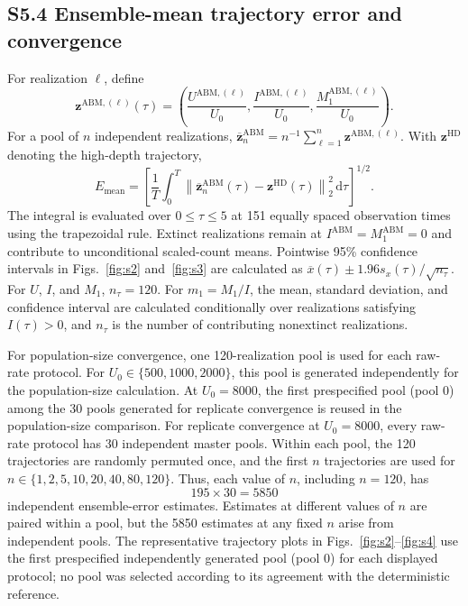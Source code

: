 \documentclass[11pt]{article}
\begin{document}
\subsection*{S5.4 Ensemble-mean trajectory error and convergence}
For realization $\ell$, define
\[
\mathbf z^{\mathrm{ABM},(\ell)}(\tau)=\left(\frac{U^{\mathrm{ABM},(\ell)}}{U_0},\frac{I^{\mathrm{ABM},(\ell)}}{U_0},\frac{M_1^{\mathrm{ABM},(\ell)}}{U_0}\right).
\]
For a pool of $n$ independent realizations, $\overline{\mathbf z}_n^{\mathrm{ABM}}=n^{-1}\sum_{\ell=1}^n\mathbf z^{\mathrm{ABM},(\ell)}$. With $\mathbf z^{\mathrm{HD}}$ denoting the high-depth trajectory,
\[
E_{\mathrm{mean}}=\left[\frac1T\int_0^T\left\|\overline{\mathbf z}_n^{\mathrm{ABM}}(\tau)-\mathbf z^{\mathrm{HD}}(\tau)\right\|_2^2\,\mathrm d\tau\right]^{1/2}.
\]
The integral is evaluated over $0\leq\tau\leq5$ at 151 equally spaced observation times using the trapezoidal rule. Extinct realizations remain at $I^{\mathrm{ABM}}=M_1^{\mathrm{ABM}}=0$ and contribute to unconditional scaled-count means. Pointwise 95\% confidence intervals in Figs.~\ref{fig:s2} and~\ref{fig:s3} are calculated as $\overline{x}(\tau)\pm1.96s_x(\tau)/\sqrt{n_\tau}$. For $U$, $I$, and $M_1$, $n_\tau=120$. For $m_1=M_1/I$, the mean, standard deviation, and confidence interval are calculated conditionally over realizations satisfying $I(\tau)>0$, and $n_\tau$ is the number of contributing nonextinct realizations.

For population-size convergence, one 120-realization pool is used for each raw-rate protocol. For $U_0\in\{500,1000,2000\}$, this pool is generated independently for the population-size calculation. At $U_0=8000$, the first prespecified pool (pool 0) among the 30 pools generated for replicate convergence is reused in the population-size comparison. For replicate convergence at $U_0=8000$, every raw-rate protocol has 30 independent master pools. Within each pool, the 120 trajectories are randomly permuted once, and the first $n$ trajectories are used for $n\in\{1,2,5,10,20,40,80,120\}$. Thus, each value of $n$, including $n=120$, has
\[
195\times30=5850
\]
independent ensemble-error estimates. Estimates at different values of $n$ are paired within a pool, but the 5850 estimates at any fixed $n$ arise from independent pools. The representative trajectory plots in Figs.~\ref{fig:s2}--\ref{fig:s4} use the first prespecified independently generated pool (pool 0) for each displayed protocol; no pool was selected according to its agreement with the deterministic reference.
\end{document}
